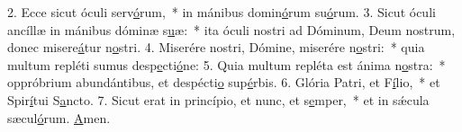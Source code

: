 2. Ecce sicut óculi serv\uline{ó}rum,~* in mánibus domin\uline{ó}rum su\uline{ó}rum.
3. Sicut óculi ancíllæ in mánibus dóminæ s\uline{u}æ:~* ita óculi nostri ad Dóminum, Deum nostrum, donec misere\uline{á}tur n\uline{o}stri.
4. Miserére nostri, Dómine, miserére n\uline{o}stri:~* quia multum repléti sumus desp\uline{e}cti\uline{ó}ne:
5. Quia multum repléta est ánima n\uline{o}stra:~* oppróbrium abundántibus, et despécti\uline{o} sup\uline{é}rbis.
6. Glória Patri, et F\uline{í}lio,~* et Spir\uline{í}tui S\uline{a}ncto.
7. Sicut erat in princípio, et nunc, et s\uline{e}mper,~* et in sǽcula sæcul\uline{ó}rum. \uline{A}men.
